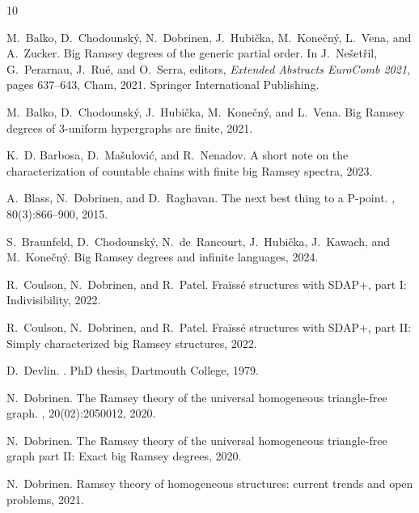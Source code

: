 \documentclass[11pt]{article}
\theoremstyle{plain}
\theoremstyle{definition}
\begin{document}

\begin{thebibliography}{10}

M.~Balko, D.~Chodounsk{\'y}, N.~Dobrinen, J.~Hubi{\v{c}}ka,
  M.~Kone{\v{c}}n{\'y}, L.~Vena, and A.~Zucker.
\newblock Big {Ramsey} degrees of the generic partial order.
\newblock In J.~Ne{\v{s}}et{\v{r}}il, G.~Perarnau, J.~Ru{\'e}, and O.~Serra,
  editors, {\em Extended Abstracts EuroComb 2021}, pages 637--643, Cham, 2021.
  Springer International Publishing.

M.~Balko, D.~Chodounský, J.~Hubička, M.~Konečný, and L.~Vena.
\newblock Big {Ramsey} degrees of 3-uniform hypergraphs are finite, 2021.

K.~D. Barbosa, D.~Mašulović, and R.~Nenadov.
\newblock A short note on the characterization of countable chains with finite
  big {Ramsey} spectra, 2023.

A.~Blass, N.~Dobrinen, and D.~Raghavan.
\newblock The next best thing to a {P}-point.
, 80(3):866–900, 2015.

S.~Braunfeld, D.~Chodounský, N.~de~Rancourt, J.~Hubička, J.~Kawach, and
  M.~Konečný.
\newblock Big {Ramsey} degrees and infinite languages, 2024.

R.~Coulson, N.~Dobrinen, and R.~Patel.
\newblock Fra\"iss\'e structures with {SDAP}+, part {I}: Indivisibility, 2022.

R.~Coulson, N.~Dobrinen, and R.~Patel.
\newblock Fra\"iss\'e structures with {SDAP}+, part {II}: Simply characterized
  big {Ramsey} structures, 2022.

D.~Devlin.
.
\newblock PhD thesis, Dartmouth College, 1979.

N.~Dobrinen.
\newblock The {R}amsey theory of the universal homogeneous triangle-free graph.
, 20(02):2050012, 2020.

N.~Dobrinen.
\newblock The {Ramsey} theory of the universal homogeneous triangle-free graph
  part {II}: Exact big {Ramsey} degrees, 2020.

N.~Dobrinen.
\newblock Ramsey theory of homogeneous structures: current trends and open
  problems, 2021.


\end{thebibliography}
\end{document}
